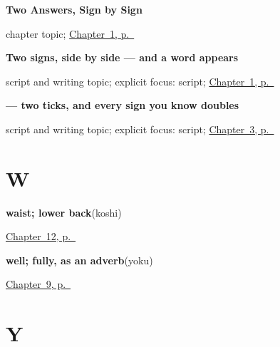 \noindent\begin{minipage}[t]{\linewidth}
\raggedright
\textbf{Two Answers, Sign by Sign}\par
\footnotesize chapter topic; \hyperref[ch:ja-two-answers]{Chapter~1, p.~\pageref*{ch:ja-two-answers}}
\end{minipage}\par\smallskip

\noindent\begin{minipage}[t]{\linewidth}
\raggedright
\textbf{Two signs, side by side — and a word appears}\par
\footnotesize script and writing topic; explicit focus: script; \hyperref[ch:ja-two-answers]{Chapter~1, p.~\pageref*{ch:ja-two-answers}}
\end{minipage}\par\smallskip

\noindent\begin{minipage}[t]{\linewidth}
\raggedright
\textbf{— two ticks, and every sign you know doubles}\par
\footnotesize script and writing topic; explicit focus: script; \hyperref[ch:ja-plain-thanks]{Chapter~3, p.~\pageref*{ch:ja-plain-thanks}}
\end{minipage}\par\smallskip

\section*{W}

\noindent\begin{minipage}[t]{\linewidth}
\raggedright
\textbf{waist; lower back}\enspace\emph{}\enspace(koshi)\par
\footnotesize \hyperref[ch:ja-body-seven-more]{Chapter~12, p.~\pageref*{ch:ja-body-seven-more}}
\end{minipage}\par\smallskip

\noindent\begin{minipage}[t]{\linewidth}
\raggedright
\textbf{well; fully, as an adverb}\enspace\emph{}\enspace(yoku)\par
\footnotesize \hyperref[ch:ja-repeat-please]{Chapter~9, p.~\pageref*{ch:ja-repeat-please}}
\end{minipage}\par\smallskip

\section*{Y}

